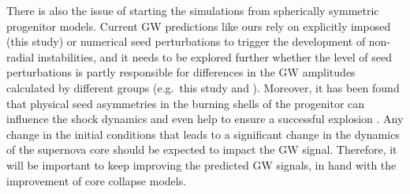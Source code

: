 There is also the issue of starting the simulations from spherically symmetric progenitor models.
{Current GW predictions like ours rely on explicitly imposed (this study) or numerical
seed perturbations to trigger the development of non-radial instabilities, and it needs
to be explored further whether the level of seed perturbations is partly responsible for
differences in the GW amplitudes calculated by different groups (e.g.\ this study and \citealt{yakunin_17}).
Moreover, it} has been found that {physical seed} asymmetries in the burning shells of the progenitor can 
influence the shock dynamics and even help to ensure a
successful explosion \citep{burrows_96,fryer_04,arnett_11,couch_13,mueller_15a}. Any change
in the initial conditions that leads to a significant change in the dynamics of the
supernova core should be expected to impact the GW signal. Therefore, it will 
be important to keep improving the predicted GW signals, in hand with the improvement of
core collapse models.



%


%

